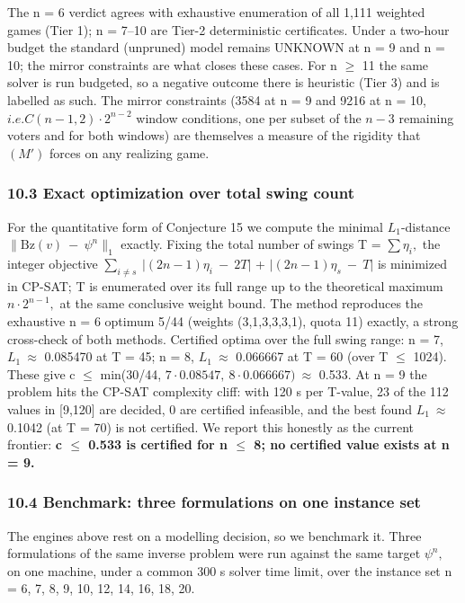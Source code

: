 \documentclass[
]{article}
\begin{document}
The n = 6 verdict agrees with exhaustive enumeration of all 1,111
weighted games (Tier 1); n = 7--10 are Tier-2 deterministic
certificates. Under a two-hour budget the standard (unpruned) model
remains UNKNOWN at n = 9 and n = 10; the mirror constraints are what
closes these cases. For n \(\ge\) 11 the same solver is run budgeted, so
a negative outcome there is heuristic (Tier 3) and is labelled as such.
The mirror constraints (3584 at n = 9 and 9216 at n = 10,
\(i.e. C(n-1,2)\cdot2^{n-2}\) window conditions, one per subset of the
\(n-3\) remaining voters and for both windows) are themselves a measure
of the rigidity that \((M')\) forces on any realizing game.

\subsubsection{10.3 Exact optimization over total swing
count}\label{exact-optimization-over-total-swing-count}

For the quantitative form of Conjecture 15 we compute the minimal
\(L_1\)-distance \(\|\mathrm{Bz}(v)\ -\ \psi^n\|_1\) exactly. Fixing the
total number of swings T = \(\sum\eta_i,\) the integer objective
\(\sum_{i\ne s}\ \vert(2n-1)\eta_i\ -\ 2T\vert\) +
\(\vert(2n-1)\eta_s\ -\ T\vert\) is minimized in CP-SAT; T is enumerated
over its full range up to the theoretical maximum \(n\cdot2^{n-1},\) at
the same conclusive weight bound. The method reproduces the exhaustive n
= 6 optimum 5/44 (weights (3,1,3,3,3,1), quota 11) exactly, a strong
cross-check of both methods. Certified optima over the full swing range:
n = 7, \(L_1\ \approx\) 0.085470 at T = 45; n = 8, \(L_1\ \approx\)
0.066667 at T = 60 (over T \(\le\) 1024). These give c \(\le\)
min(30/44, \(7\cdot0.08547,\ 8\cdot0.066667)\ \approx\) 0.533. At n = 9
the problem hits the CP-SAT complexity cliff: with 120 s per T-value, 23
of the 112 values in {[}9,120{]} are decided, 0 are certified
infeasible, and the best found \(L_1\ \approx\) 0.1042 (at T = 70) is
not certified. We report this honestly as the current frontier:
\textbf{c \(\le\) 0.533 is certified for n \(\le\) 8; no certified value
exists at n = 9.}

\subsubsection{10.4 Benchmark: three formulations on one instance
set}\label{benchmark-three-formulations-on-one-instance-set}

The engines above rest on a modelling decision, so we benchmark it.
Three formulations of the same inverse problem were run against the same
target \(\psi^n,\) on one machine, under a common 300 s solver time
limit, over the instance set n = 6, 7, 8, 9, 10, 12, 14, 16, 18, 20.
\end{document}
